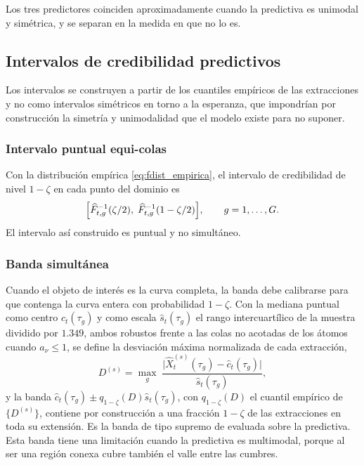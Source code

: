 Los tres predictores coinciden aproximadamente cuando la predictiva es unimodal y simétrica, y se separan en la medida en que no lo es. 

\subsection{Intervalos de credibilidad predictivos}
\label{03_05_05_intervalos_predictivos}

Los intervalos se construyen a partir de los cuantiles empíricos de las extracciones y no como intervalos simétricos en torno a la esperanza, que impondrían por construcción la simetría y unimodalidad que el modelo existe para no suponer.\\


\subsubsection{Intervalo puntual equi-colas}
\label{03_05_05_01_equicolas}
Con la distribución empírica \eqref{eq:fdist_empirica}, el intervalo de credibilidad de nivel $1-\zeta$ en cada punto del dominio es
\begin{equation}\label{eq:intervalo_puntual}
    \Bigl[\widehat{F}_{t,g}^{-1}(\zeta/2),\;
    \widehat{F}_{t,g}^{-1}(1-\zeta/2)\Bigr],
    \qquad g = 1, \dots, G.
\end{equation}
El intervalo así construido es puntual y no simultáneo.

\subsubsection{Banda simultánea}
\label{03_05_05_02_banda_simultanea}
Cuando el objeto de interés es la curva completa, la banda debe calibrarse para que contenga la curva entera con probabilidad $1-\zeta$. Con la mediana puntual como centro $\widehat{c}_t(\tau_g)$ y como escala $\widehat{s}_t(\tau_g)$ el rango intercuartílico de la muestra dividido por $1.349$, ambos robustos frente a las colas no acotadas de los átomos cuando $a_\nu \le 1$, se define la desviación máxima normalizada de cada extracción,
\begin{equation}\label{eq:supnorma}
    D^{(s)} = \max_{g}\;\frac{\bigl|\widehat{X}_t^{(s)}(\tau_g) - \widehat{c}_t(\tau_g)\bigr|}{\widehat{s}_t(\tau_g)},
\end{equation}
y la banda $\widehat{c}_t(\tau_g) \pm q_{1-\zeta}(D)\widehat{s}_t(\tau_g)$, con $q_{1-\zeta}(D)$ el cuantil empírico de $\{D^{(s)}\}$, contiene por construcción a una fracción $1-\zeta$ de las extracciones en toda su extensión. Es la banda de tipo supremo de \citet{03_05_degras2011bands} evaluada sobre la predictiva. Esta banda tiene una limitación cuando la predictiva es multimodal, porque al ser una región conexa cubre también el valle entre las cumbres.

